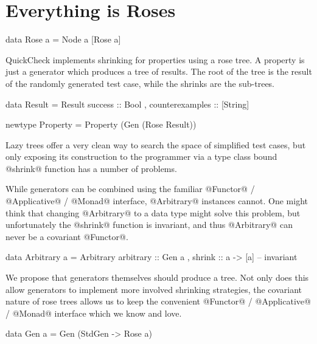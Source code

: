 \section{Everything is Roses}


\begin{code}
  data Rose a =
    Node a [Rose a]
\end{code}

QuickCheck implements shrinking for properties using a rose tree. A property is just a generator which produces a tree of results. The root of the tree is the result of the randomly generated test case, while the shrinks are the sub-trees.

\begin{code}
  data Result =
    Result {
        success         :: Bool
      , counterexamples :: [String]
      }

  newtype Property =
    Property (Gen (Rose Result))
\end{code}

Lazy trees offer a very clean way to search the space of simplified test cases, but only exposing its construction to the programmer via a type class bound @shrink@ function has a number of problems.

While generators can be combined using the familiar @Functor@ / @Applicative@ / @Monad@ interface, @Arbitrary@ instances cannot. One might think that changing @Arbitrary@ to a data type might solve this problem, but unfortunately the @shrink@ function is invariant, and thus @Arbitrary@ can never be a covariant @Functor@.

\begin{code}
  data Arbitrary a =
    Arbitrary {
        arbitrary :: Gen a
      , shrink    :: a -> [a] -- invariant
      }
\end{code}

We propose that generators themselves should produce a tree. Not only does this allow generators to implement more involved shrinking strategies, the covariant nature of rose trees allows us to keep the convenient @Functor@ / @Applicative@ / @Monad@ interface which we know and love.


\begin{code}
  data Gen a =
    Gen (StdGen -> Rose a)
\end{code}

